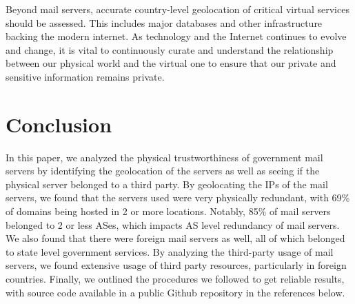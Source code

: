 \documentclass{hotnets21}
\begin{document}
Beyond mail servers, accurate country-level geolocation of critical virtual services should be assessed.
This includes major databases and other infrastructure backing the modern internet.
As technology and the Internet continues to evolve and change, it is vital to continuously curate and understand the relationship between our physical world and the virtual one to ensure that our private and sensitive information remains private.

\section{Conclusion}

In this paper, we analyzed the physical trustworthiness of government mail servers by identifying the geolocation of the servers as well as seeing if the physical server belonged to a third party.
By geolocating the IPs of the mail servers, we found that the servers used were very physically redundant, with 69\% of domains being hosted in 2 or more locations.
Notably, 85\% of mail servers belonged to 2 or less ASes, which impacts AS level redundancy of mail servers.
We also found that there were foreign mail servers as well, all of which belonged to state level government services.
By analyzing the third-party usage of mail servers, we found extensive usage of third party resources, particularly in foreign countries.
Finally, we outlined the procedures we followed to get reliable results, with source code available in a public Github repository in the references below.

 
\begin{small}

\end{small}
\end{document}
